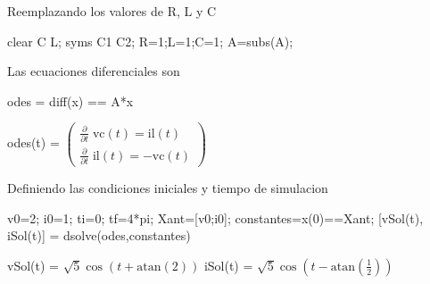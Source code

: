 \documentclass[10pt,a4paper]{article} %
\begin{document}
	\begin{par}
		\begin{flushleft}
			Reemplazando los valores de R, L y C
		\end{flushleft}
	\end{par}
	
	\begin{matlabcode}
		clear C L;
		syms C1 C2;
		R=1;L=1;C=1;
		A=subs(A);
	\end{matlabcode}
	
	\begin{par}
		\begin{flushleft}
			Las ecuaciones diferenciales son
		\end{flushleft}
	\end{par}
	
	\begin{matlabcode}
		odes = diff(x) == A*x
	\end{matlabcode}
	\begin{matlabsymbolicoutput}
		odes(t) = 
		$\displaystyle \left(\begin{array}{c}
		\frac{\partial }{\partial t}\;\textrm{vc}\left(t\right)=\textrm{il}\left(t\right)\\
		\frac{\partial }{\partial t}\;\textrm{il}\left(t\right)=-\textrm{vc}\left(t\right)
		\end{array}\right)$
	\end{matlabsymbolicoutput}
	
	\begin{par}
		\begin{flushleft}
			Definiendo las condiciones iniciales y tiempo de simulacion
		\end{flushleft}
	\end{par}
	
	\begin{matlabcode}
		v0=2;
		i0=1;
		ti=0;
		tf=4*pi;
		Xant=[v0;i0];
		constantes=x(0)==Xant;
		[vSol(t), iSol(t)] = dsolve(odes,constantes)
	\end{matlabcode}
	\begin{matlabsymbolicoutput}
		vSol(t) = 
		$\displaystyle \sqrt{5} \cos \left(t+\textrm{atan}\left(2\right)\right)$
		iSol(t) = 
		$\displaystyle \sqrt{5} \cos \left(t-\textrm{atan}\left(\frac{1}{2}\right)\right)$
	\end{matlabsymbolicoutput}
	
\end{document}
